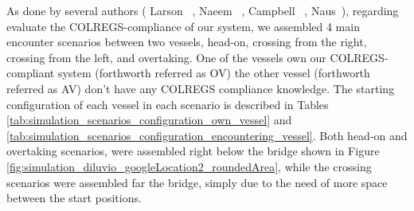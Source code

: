     As done by several authors (\eg{} Larson \etal{}~\cite{Larson2006Autonomous}, Naeem \etal{}~\cite{Naeem2012COLREGS}, Campbell \etal{}~\cite{Campbell2013Automatic}, Naus~\cite{Naus2013Idea}), regarding evaluate the \ac{COLREGS}-compliance of our system, we assembled 4 main encounter scenarios between two vessels, head-on, crossing from the right, crossing from the left, and overtaking. One of the vessels own our \ac{COLREGS}-compliant system (forthworth referred as \acl{OV}) the other vessel (forthworth referred as \acl{AV}) don't have any \ac{COLREGS} compliance knowledge. The starting configuration of each vessel in each scenario is described in Tables \ref{tab:simulation_scenarios_configuration_own_vessel} and \ref{tab:simulation_scenarios_configuration_encountering_vessel}. Both head-on and overtaking scenarios, were assembled right below the bridge shown in Figure \ref{fig:simulation_diluvio_googleLocation2_roundedArea}, while the crossing scenarios were assembled far the bridge, simply due to the need of more space between the start positions.

    
